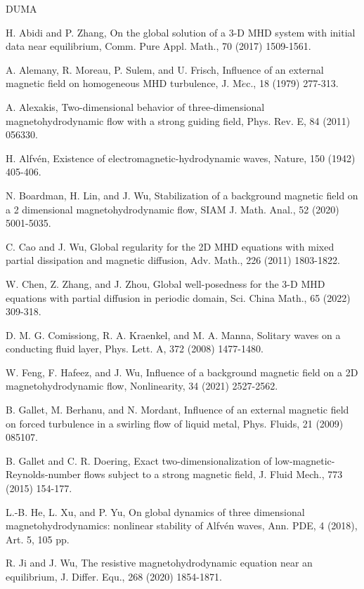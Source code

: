 \documentclass[reqno,11pt]{amsart}
\numberwithin{Thm}{section}
\begin{document}
\begin {thebibliography}{DUMA}

 H. Abidi and P. Zhang, On the global solution of a 3-D MHD system
with initial data near equilibrium, Comm. Pure Appl. Math., 70 (2017) 1509-1561.

 A. Alemany, R. Moreau, P. Sulem, and U. Frisch, Influence of an external magnetic
field on homogeneous MHD turbulence, J. M$\acute{e}$c., 18 (1979) 277-313.

 A. Alexakis, Two-dimensional behavior of three-dimensional magnetohydrodynamic
flow with a strong guiding field, Phys. Rev. E, 84 (2011) 056330.

 H. Alfv\'en, Existence of electromagnetic-hydrodynamic waves, Nature, 150 (1942) 405-406.

  N. Boardman, H. Lin, and J. Wu, Stabilization of a background magnetic field on a 2 dimensional magnetohydrodynamic flow, SIAM J. Math. Anal., 52 (2020) 5001-5035.

 C. Cao and J. Wu, Global regularity for the 2D MHD equations with mixed partial dissipation and magnetic diffusion, Adv. Math., 226 (2011) 1803-1822.

 W. Chen, Z. Zhang, and J. Zhou, Global well-posedness for the 3-D MHD equations with partial diffusion in periodic domain, Sci. China Math., 65 (2022) 309-318.

 D. M. G. Comissiong, R. A. Kraenkel, and M. A. Manna,
Solitary waves on a conducting fluid layer, Phys. Lett. A, 372 (2008) 1477-1480.

  W. Feng, F. Hafeez, and J. Wu, Influence of a background magnetic field on a 2D magnetohydrodynamic flow, Nonlinearity, 34 (2021) 2527-2562.

 B. Gallet, M. Berhanu, and N. Mordant, Influence of an external magnetic field on
forced turbulence in a swirling flow of liquid metal, Phys. Fluids, 21 (2009) 085107.

 B. Gallet and C. R. Doering, Exact two-dimensionalization of low-magnetic-Reynolds-number flows subject to a strong magnetic field, J. Fluid Mech., 773 (2015) 154-177.

 L.-B. He, L. Xu, and P. Yu, On global dynamics of three dimensional
magnetohydrodynamics: nonlinear stability of Alfv\'{e}n waves, Ann. PDE, 4 (2018),
Art. 5, 105 pp.

 R. Ji and J. Wu, The resistive magnetohydrodynamic equation near an
equilibrium, J. Differ. Equ., 268 (2020) 1854-1871.


\end{thebibliography}
\end{document}
